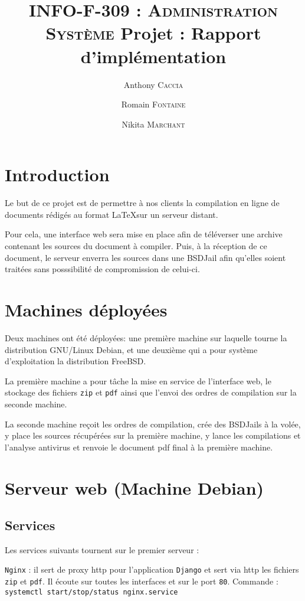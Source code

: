\documentclass[10pt,a4paper]{article}
\author{Anthony \textsc{Caccia} \and Romain \textsc{Fontaine} \and Nikita \textsc{Marchant} }
\date{}
\title{\textsc{INFO-F-309 : Administration Système} Projet : Rapport d'implémentation}
\begin{document}
\maketitle

\section{Introduction}
\label{sec:Introduction}

Le but de ce projet est de permettre à nos clients la compilation en ligne de documents rédigés au format \LaTeX sur un serveur distant.

Pour cela, une interface web sera mise en place afin de téléverser une archive contenant les sources du document à compiler.
Puis, à la réception de ce document, le serveur enverra les sources dans une BSDJail afin qu'elles soient traitées sans posssibilité de compromission de celui-ci.

\section{Machines déployées}
\label{sec:Machines déployées}

Deux machines ont été déployées: une première machine sur laquelle tourne la distribution GNU/Linux Debian, et une deuxième qui a pour système d'exploitation la distribution FreeBSD.

La première machine a pour tâche la mise en service de l'interface web,
le stockage des fichiers \texttt{zip} et \texttt{pdf}
ainsi que l'envoi des ordres de compilation sur la seconde machine.

La seconde machine reçoit les ordres de compilation, crée des BSDJails à la volée, y place les sources récupérées sur la première machine,
y lance les compilations et l'analyse antivirus et renvoie le document pdf final à la première machine.

\section{Serveur web (Machine Debian)}
\subsection{Services}
Les services suivants tournent sur le premier serveur :

\texttt{Nginx} : il sert de proxy http pour l'application \texttt{Django} et sert via http les fichiers \texttt{zip} et \texttt{pdf}.
Il écoute sur toutes les interfaces et sur le port \texttt{80}.
Commande : \texttt{systemctl start/stop/status nginx.service}
\end{document}

